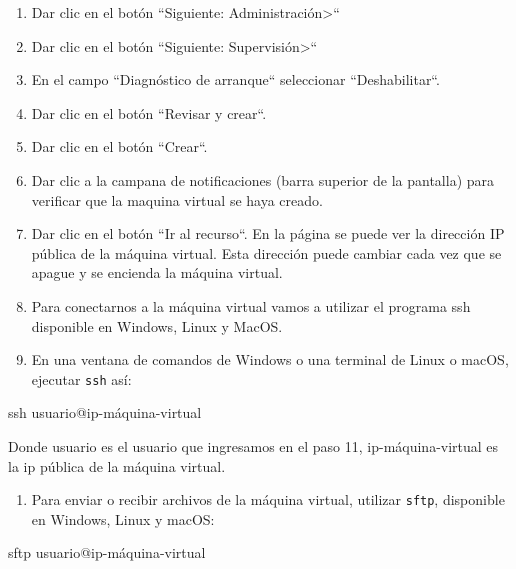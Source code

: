 \documentclass[11pt,a4paper,oneside]{book}
\begin{document}
\begin{enumerate}

\item Dar clic en el botón ``Siguiente: Administración>``

\item Dar clic en el botón ``Siguiente: Supervisión>``

\item En el campo ``Diagnóstico de arranque`` seleccionar ``Deshabilitar``.

\item Dar clic en el botón ``Revisar y crear``.

\item Dar clic en el botón ``Crear``.

\item Dar clic a la campana de notificaciones (barra superior de la pantalla) para verificar que la maquina virtual se haya creado.

\item Dar clic en el botón ``Ir al recurso``. En la página se puede ver la dirección IP pública de la máquina virtual. Esta dirección puede cambiar cada vez que se apague y se encienda la máquina virtual.

\item Para conectarnos a la máquina virtual vamos a utilizar el programa ssh disponible en Windows, Linux y MacOS.

\item En una ventana de comandos de Windows o una terminal de Linux o macOS, ejecutar \texttt{ssh} así:

\end{enumerate}

\begin{SourceCode}
ssh usuario@ip-máquina-virtual
\end{SourceCode}

Donde usuario es el usuario que ingresamos en el paso 11, ip-máquina-virtual es la ip pública de la máquina virtual.

\begin{enumerate}

\item Para enviar o recibir archivos de la máquina virtual, utilizar \texttt{sftp}, disponible en Windows, Linux y macOS:

\end{enumerate}

\begin{SourceCode}
sftp usuario@ip-máquina-virtual
\end{SourceCode}
\end{document}
